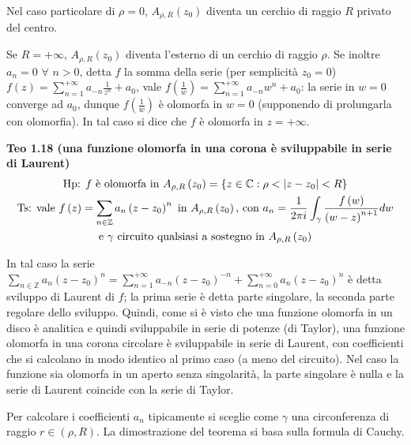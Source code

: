\documentclass{article}
\begin{document}
Nel caso particolare di $\rho =0$, $A_{\rho ,R}\left( z_{0}\right) $ diventa
un cerchio di raggio $R$ privato del centro.

Se $R=+\infty $, $A_{\rho ,R}\left( z_{0}\right) $ diventa l'esterno di un
cerchio di raggio $\rho $. Se inoltre $a_{n}=0$ $\forall $ $n>0$, detta $f$
la somma della serie (per semplicit\`{a} $z_{0}=0$) $f\left( z\right)
=\sum_{n=1}^{+\infty }a_{-n}\frac{1}{z^{n}}+a_{0}$, vale $f\left( \frac{1}{w}%
\right) =\sum_{n=1}^{+\infty }a_{-n}w^{n}+a_{0}$: la serie in $w=0$ converge
ad $a_{0}$, dunque $f\left( \frac{1}{w}\right) $ \`{e} olomorfa in $w=0$
(supponendo di prolungarla con olomorfia). In tal caso si dice che $f$ \`{e}
olomorfa in $z=+\infty $.

\textbf{Teo 1.18 (una funzione olomorfa in una corona \`{e} sviluppabile in
serie di Laurent)}%
\begin{gather*}
\text{Hp: }f\text{ \`{e} olomorfa in }A_{\rho ,R}\left( z_{0}\right)
=\left\{ z\in 
\mathbb{C}
:\rho <\left\vert z-z_{0}\right\vert <R\right\} \\
\text{Ts: vale }f\left( z\right) =\sum_{n\in 
\mathbb{Z}
}a_{n}\left( z-z_{0}\right) ^{n}\text{ in }A_{\rho ,R}\left( z_{0}\right) 
\text{, con }a_{n}=\frac{1}{2\pi i}\int_{\gamma }\frac{f\left( w\right) }{%
\left( w-z\right) ^{n+1}}dw \\
\text{e }\gamma \text{ circuito qualsiasi a sostegno in }A_{\rho ,R}\left(
z_{0}\right)
\end{gather*}

In tal caso la serie $\sum_{n\in 
\mathbb{Z}
}a_{n}\left( z-z_{0}\right) ^{n}=\sum_{n=1}^{+\infty }a_{-n}\left(
z-z_{0}\right) ^{-n}+\sum_{n=0}^{+\infty }a_{n}\left( z-z_{0}\right) ^{n}$ 
\`{e} detta sviluppo di Laurent di $f$; la prima serie \`{e} detta parte
singolare, la seconda parte regolare dello sviluppo. Quindi, come si \`{e}
visto che una funzione olomorfa in un disco \`{e} analitica e quindi
sviluppabile in serie di potenze (di Taylor), una funzione olomorfa in una
corona circolare \`{e} sviluppabile in serie di Laurent, con coefficienti
che si calcolano in modo identico al primo caso (a meno del circuito). Nel
caso la funzione sia olomorfa in un aperto senza singolarit\`{a}, la parte
singolare \`{e} nulla e la serie di Laurent coincide con la serie di Taylor.

Per calcolare i coefficienti $a_{n}$ tipicamente si sceglie come $\gamma $
una circonferenza di raggio $r\in \left( \rho ,R\right) $. La dimostrazione
del teorema si basa sulla formula di Cauchy.
\end{document}
